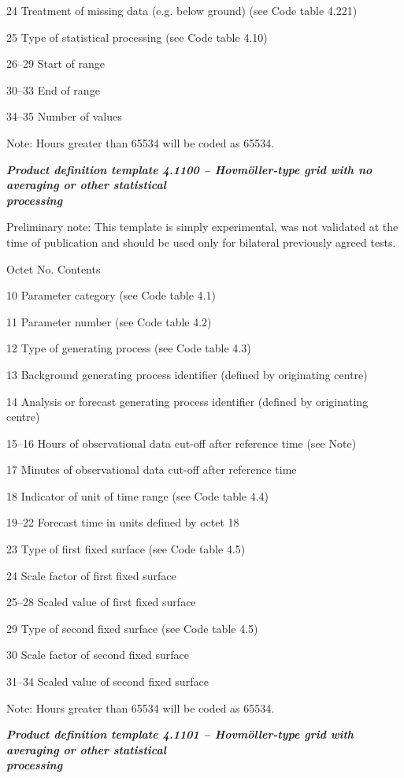 24 Treatment of missing data (e.g. below ground) (see Code table 4.221)

25 Type of statistical processing (see Code table 4.10)

26--29 Start of range

30--33 End of range

34--35 Number of values

Note: Hours greater than 65534 will be coded as 65534.

\emph{\textbf{Product definition template 4.1100 -- Hovmöller-type grid with no averaging or other statistical\\
processing}}

Preliminary note: This template is simply experimental, was not validated at the time of publication and should be used only for bilateral previously agreed tests.

Octet No. Contents

10 Parameter category (see Code table 4.1)

11 Parameter number (see Code table 4.2)

12 Type of generating process (see Code table 4.3)

13 Background generating process identifier (defined by originating centre)

14 Analysis or forecast generating process identifier (defined by originating centre)

15--16 Hours of observational data cut-off after reference time (see Note)

17 Minutes of observational data cut-off after reference time

18 Indicator of unit of time range (see Code table 4.4)

19--22 Forecast time in units defined by octet 18

23 Type of first fixed surface (see Code table 4.5)

24 Scale factor of first fixed surface

25--28 Scaled value of first fixed surface

29 Type of second fixed surface (see Code table 4.5)

30 Scale factor of second fixed surface

31--34 Scaled value of second fixed surface

Note: Hours greater than 65534 will be coded as 65534.

\emph{\textbf{Product definition template 4.1101 -- Hovmöller-type grid with averaging or other statistical\\
processing}}

